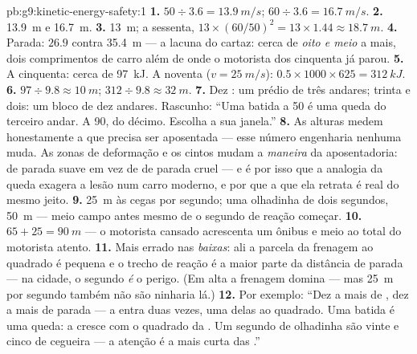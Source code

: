 \begin{solution}{pb:g9:kinetic-energy-safety:1}
\textbf{1.} $50 \div 3.6 = \qty{13.9}{m/s}$;
$60 \div 3.6 = \qty{16.7}{m/s}$.
\textbf{2.} \qty{13.9}{m} e \qty{16.7}{m}.
\textbf{3.} \qty{13}{m}; a sessenta,
$13 \times (60/50)^2 = 13 \times 1.44 \approx \qty{18.7}{m}$.
\textbf{4.} Parada: $26.9$ contra \qty{35.4}{m} --- a lacuna do
cartaz: cerca de \emph{oito  e meio} a mais, dois comprimentos
de carro além de onde o motorista dos cinquenta já parou.
\textbf{5.} A cinquenta: cerca de \qty{97}{kJ}. A noventa
($v = \qty{25}{m/s}$): $0.5 \times 1000 \times 625 = \qty{312}{kJ}$.
\textbf{6.} $97 \div 9.8 \approx \qty{10}{m}$;
$312 \div 9.8 \approx \qty{32}{m}$.
\textbf{7.} Dez : um prédio de três andares; trinta e dois: um
bloco de dez andares. Rascunho: ``Uma batida a 50 é uma queda do
terceiro andar. A 90, do décimo. Escolha a sua janela.''
\textbf{8.} As alturas medem honestamente a  que precisa ser
aposentada --- esse número engenharia nenhuma muda. As zonas de
deformação e os cintos mudam a \emph{maneira} da aposentadoria:
 de parada suave em vez de  de parada cruel --- e é
por isso que a analogia da queda exagera a lesão num carro moderno, e
por que a  que ela retrata é real do mesmo jeito.
\textbf{9.} \qty{25}{m} às cegas por segundo; uma olhadinha de dois
segundos, \qty{50}{m} --- meio campo antes mesmo de o segundo de
reação começar.
\textbf{10.} $65 + 25 = \qty{90}{m}$ --- o motorista cansado
acrescenta um ônibus e meio ao total do motorista atento.
\textbf{11.} Mais errado nas  \emph{baixas}: ali a parcela
da frenagem ao quadrado é pequena e o trecho de reação é a maior
parte da distância de parada --- na cidade, o segundo \emph{é} o
perigo. (Em alta  a frenagem domina --- mas \qty{25}{m} por
segundo também não são ninharia lá.)
\textbf{12.} Por exemplo: ``Dez a mais de , dez  a
mais de parada --- a  entra duas vezes, uma delas ao
quadrado. Uma batida é uma queda: a  cresce com o quadrado da
. Um segundo de olhadinha são vinte e cinco  de
cegueira --- a atenção é a mais curta das .''
\end{solution}
